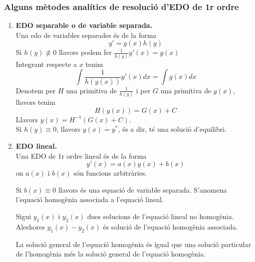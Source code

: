 \documentclass[../main.tex]{subfiles}
\begin{document}
\subsubsection{Alguns mètodes analítics de resolució d'EDO de 1r ordre}
\begin{enumerate}
    \item \textbf{EDO separable o de variable separada.}\\
    Una edo de variables separades és de la forma
    \begin{displaymath}
        y' = g\left(x\right) h\left(y\right)
    \end{displaymath}
    Si $h\left(y\right) \not\equiv 0$ llavors podem fer $\frac{1}{h\left(y\right)} y'\left(x\right) = g\left(x\right)$\\
    Integrant respecte a $x$ tenim
    \begin{displaymath}
        \int \frac{1}{h\left(y(x)\right)} y'(x) dx = \int g(x) dx
    \end{displaymath}
    Denotem per $H$ una primitiva de $\frac{1}{h\left(y\right)}$ i per $G$ una primitiva de $g(x)$,
    llavors tenim
    \begin{displaymath}
        H(y(x)) = G(x) + C
    \end{displaymath}
    Llavors $y(x) = H^{-1}\left(G(x)+C\right)$.\\
    Si $h\left(y\right) \equiv 0$, llavors $y(x) = y^*$, és a dir, té una solució d'equilibri.
    \item \textbf{EDO lineal.}\\
    Una EDO de 1r ordre lineal és de la forma
    \begin{displaymath}
        y'(x) = a(x) y(x) + b(x)
    \end{displaymath}
    on $a(x)$ i $b(x)$ són funcions arbitràries.
    \begin{obs}
        Si $b(x) \equiv 0$ llavors és una equació de variable separada. S'anomena l'equació
        homogènia associada a l'equació lineal. 
    \end{obs}
    \begin{proposicio}
        Sigui $y_1(x)$ i $y_2(x)$ dues solucions de l'equació lineal no homogènia. Aleshores $y_1(x)-y_2(x)$
        és solució de l'equació homogènia associada.
    \end{proposicio}
    \begin{corolari}
        La solució general de l'equació homogènia és igual que una solució particular de l'homogènia
        més la solució general de l'equació homogènia.

\end{corolari}
\end{enumerate}
\end{document}
